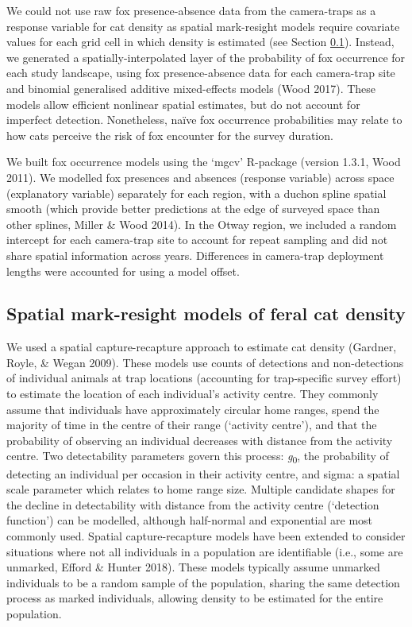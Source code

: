 \documentclass[preprint, 3p, authoryear]{elsarticle} %
\begin{document}
We could not use raw fox presence-absence data from the camera-traps as a response variable for cat density as spatial mark-resight models require covariate values for each grid cell in which density is estimated (see Section \ref{density-methods-smr}). Instead, we generated a spatially-interpolated layer of the probability of fox occurrence for each study landscape, using fox presence-absence data for each camera-trap site and binomial generalised additive mixed-effects models (Wood 2017). These models allow efficient nonlinear spatial estimates, but do not account for imperfect detection. Nonetheless, naïve fox occurrence probabilities may relate to how cats perceive the risk of fox encounter for the survey duration.

We built fox occurrence models using the `mgcv' R-package (version 1.3.1, Wood 2011). We modelled fox presences and absences (response variable) across space (explanatory variable) separately for each region, with a duchon spline spatial smooth (which provide better predictions at the edge of surveyed space than other splines, Miller \& Wood 2014). In the Otway region, we included a random intercept for each camera-trap site to account for repeat sampling and did not share spatial information across years. Differences in camera-trap deployment lengths were accounted for using a model offset.

\hypertarget{density-methods-smr}{%
\subsection{Spatial mark-resight models of feral cat density}\label{density-methods-smr}}

We used a spatial capture-recapture approach to estimate cat density (Gardner, Royle, \& Wegan 2009). These models use counts of detections and non-detections of individual animals at trap locations (accounting for trap-specific survey effort) to estimate the location of each individual's activity centre. They commonly assume that individuals have approximately circular home ranges, spend the majority of time in the centre of their range (`activity centre'), and that the probability of observing an individual decreases with distance from the activity centre. Two detectability parameters govern this process: \emph{g}\textsubscript{0}, the probability of detecting an individual per occasion in their activity centre, and sigma: a spatial scale parameter which relates to home range size. Multiple candidate shapes for the decline in detectability with distance from the activity centre (`detection function') can be modelled, although half-normal and exponential are most commonly used. Spatial capture-recapture models have been extended to consider situations where not all individuals in a population are identifiable (i.e., some are unmarked, Efford \& Hunter 2018). These models typically assume unmarked individuals to be a random sample of the population, sharing the same detection process as marked individuals, allowing density to be estimated for the entire population.
\end{document}
